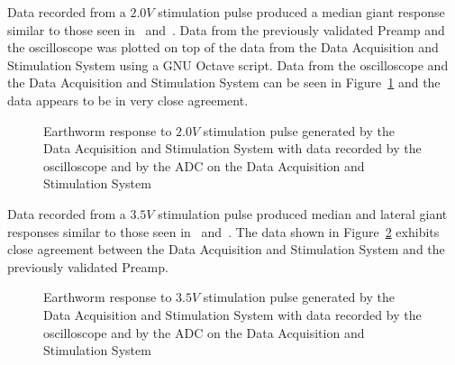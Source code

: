 Data recorded from a $2.0\unit{V}$ stimulation pulse produced a median giant response similar to those seen in~\cite{StahlMSEE} and~\cite{EllingerMSEE}.  Data from the previously validated Preamp and the oscilloscope was plotted on top of the data from the Data Acquisition and Stimulation System using a GNU Octave script.  Data from the oscilloscope and the Data Acquisition and Stimulation System can be seen in Figure~\ref{fig:EWMedResp} and the data appears to be in very close agreement.

\begin{figure}[H]
	\begin{singlespace}
	\centering 
		\resizebox{\textwidth-0.5in}{!}{}
	\caption{Earthworm response to $2.0\unit{V}$ stimulation pulse generated by the Data Acquisition and Stimulation System with data recorded by the oscilloscope and by the ADC on the Data Acquisition and Stimulation System\label{fig:EWMedResp}}
	\end{singlespace}
\end{figure}

Data recorded from a $3.5\unit{V}$ stimulation pulse produced median and lateral giant responses similar to those seen in~\cite{StahlMSEE} and~\cite{EllingerMSEE}.  The data shown in Figure~\ref{fig:EWLatResp} exhibits close agreement between the Data Acquisition and Stimulation System and the previously validated Preamp.

\begin{figure}[H]
	\begin{singlespace}
	\centering 
		\resizebox{\textwidth-0.5in}{!}{}
	\caption{Earthworm response to $3.5\unit{V}$ stimulation pulse generated by the Data Acquisition and Stimulation System with data recorded by the oscilloscope and by the ADC on the Data Acquisition and Stimulation System\label{fig:EWLatResp}}
	\end{singlespace}
\end{figure}
